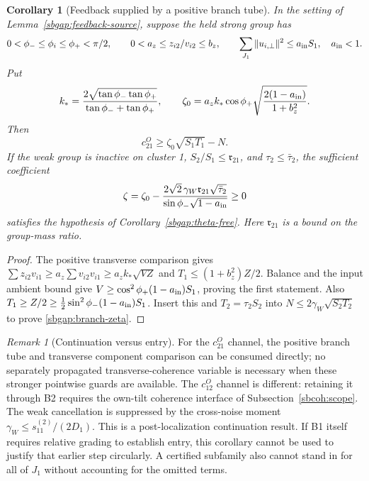 \documentclass{article} %
\theoremstyle{plain}
\newtheorem{corollary}[theorem]{Corollary}
\theoremstyle{definition}
\theoremstyle{remark}
\newtheorem{remark}[theorem]{Remark}
\begin{document}
\begin{corollary}[Feedback supplied by a positive branch tube]
\label{sbgap:branch-feedback}
In the setting of Lemma~\ref{sbgap:feedback-source}, suppose the held
strong group has
\[
 0<\phi_-\le\phi_i\le\phi_+<\pi/2,\qquad
 0<a_z\le z_{i2}/v_{i2}\le b_z,\qquad
 \sum_{J_1}\|u_{i,\perp}\|^2\le a_{\rm in}S_1,\quad a_{\rm in}<1.
\]
Put
\[
 k_*=\frac{2\sqrt{\tan\phi_-\tan\phi_+}}
                      {\tan\phi_-+\tan\phi_+},\qquad
 \zeta_0=a_z k_*\cos\phi_+
                    \sqrt{\frac{2(1-a_{\rm in})}{1+b_z^2}}.
\]
Then
\[
 c_{21}^O\ge\zeta_0\sqrt{S_1T_1}-N.
\]
If the weak group is inactive on cluster 1, $S_2/S_1\le\mathfrak r_{21}$,
and $\tau_2\le\bar\tau_2$, the sufficient coefficient
\begin{equation}\label{sbgap:branch-zeta}
 \zeta=\zeta_0-
 \frac{2\sqrt2\,\gamma_W\mathfrak r_{21}\sqrt{\bar\tau_2}}
             {\sin\phi_-\sqrt{1-a_{\rm in}}}\ge0
\end{equation}
satisfies the hypothesis of Corollary~\ref{sbgap:theta-free}.
Here $\mathfrak r_{21}$ is a bound on the group-mass ratio.
\end{corollary}
\begin{proof}
The positive transverse comparison gives
$\sum z_{i2}v_{i1}\ge a_z\sum v_{i2}v_{i1}
\ge a_z k_*\sqrt{VZ}$ and
$T_1\le(1+b_z^2)Z/2$.
Balance and the input ambient bound give
$V\ge\cos^2\phi_+(1-a_{\rm in})S_1$, proving the first statement.
Also
$T_1\ge Z/2\ge\frac12\sin^2\phi_-(1-a_{\rm in})S_1$.
Insert this and $T_2=\tau_2S_2$ into
$N\le2\gamma_W\sqrt{S_2T_2}$ to prove \eqref{sbgap:branch-zeta}.
\end{proof}

\begin{remark}[Continuation versus entry]
For the $c_{21}^O$ channel, the positive branch tube and transverse component
comparison can be consumed directly; no separately propagated
transverse-coherence variable is necessary when these stronger pointwise
guards are available.  The $c_{12}^O$ channel is different: retaining it
through B2 requires the own-tilt coherence interface of
Subsection~\ref{sbcoh:scope}.
The weak cancellation is suppressed by the cross-noise moment
$\gamma_W\le s_{11}^{(2)}/(2D_1)$.
This is a post-localization continuation result. If B1 itself requires
relative grading to establish entry, this corollary cannot be used to
justify that earlier step circularly. A certified subfamily also cannot
stand in for all of $J_1$ without accounting for the omitted terms.
\end{remark}
\end{document}
